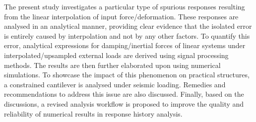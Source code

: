 The present study investigates a particular type of spurious responses resulting from the linear interpolation of input force/deformation. These responses are analysed in an analytical manner, providing clear evidence that the isolated error is entirely caused by interpolation and not by any other factors. To quantify this error, analytical expressions for damping/inertial forces of linear systems under interpolated/upsampled external loads are derived using signal processing methods. The results are then further elaborated upon using numerical simulations. To showcase the impact of this phenomenon on practical structures, a constrained cantilever is analysed under seismic loading. Remedies and recommendations to address this issue are also discussed. Finally, based on the discussions, a revised analysis workflow is proposed to improve the quality and reliability of numerical results in response history analysis.